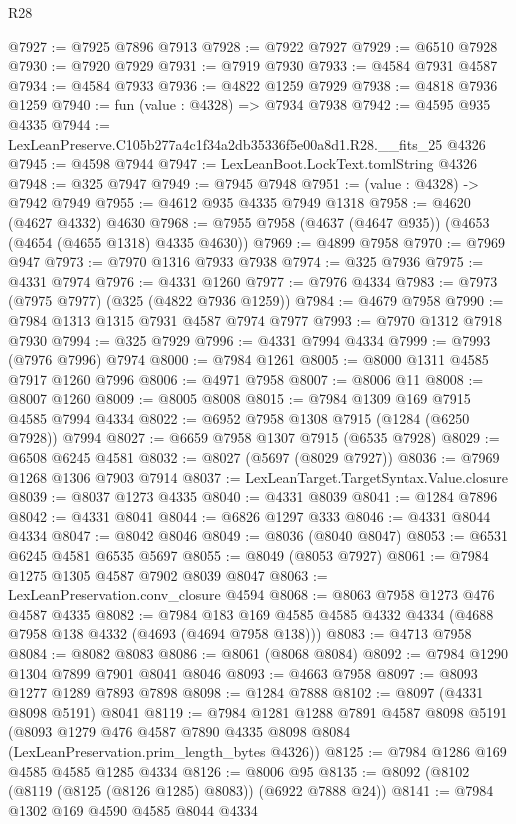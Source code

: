 \begin{lexlean}{R28}
\begin{coremodule}
@7927 := @7925 @7896 @7913
@7928 := @7922 @7927
@7929 := @6510 @7928
@7930 := @7920 @7929
@7931 := @7919 @7930
@7933 := @4584 @7931 @4587
@7934 := @4584 @7933
@7936 := @4822 @1259 @7929
@7938 := @4818 @7936 @1259
@7940 := fun (value : @4328) => @7934 @7938
@7942 := @4595 @935 @4335
@7944 := LexLeanPreserve.C105b277a4c1f34a2db35336f5e00a8d1.R28.__fits_25 @4326
@7945 := @4598 @7944
@7947 := LexLeanBoot.LockText.tomlString @4326
@7948 := @325 @7947
@7949 := @7945 @7948
@7951 := (value : @4328) -> @7942 @7949
@7955 := @4612 @935 @4335 @7949 @1318
@7958 := @4620 (@4627 @4332) @4630
@7968 := @7955 @7958 (@4637 (@4647 @935)) (@4653 (@4654 (@4655 @1318) @4335 @4630))
@7969 := @4899 @7958
@7970 := @7969 @947
@7973 := @7970 @1316 @7933 @7938
@7974 := @325 @7936
@7975 := @4331 @7974
@7976 := @4331 @1260
@7977 := @7976 @4334
@7983 := @7973 (@7975 @7977) (@325 (@4822 @7936 @1259))
@7984 := @4679 @7958
@7990 := @7984 @1313 @1315 @7931 @4587 @7974 @7977
@7993 := @7970 @1312 @7918 @7930
@7994 := @325 @7929
@7996 := @4331 @7994 @4334
@7999 := @7993 (@7976 @7996) @7974
@8000 := @7984 @1261
@8005 := @8000 @1311 @4585 @7917 @1260 @7996
@8006 := @4971 @7958
@8007 := @8006 @11
@8008 := @8007 @1260
@8009 := @8005 @8008
@8015 := @7984 @1309 @169 @7915 @4585 @7994 @4334
@8022 := @6952 @7958 @1308 @7915 (@1284 (@6250 @7928)) @7994
@8027 := @6659 @7958 @1307 @7915 (@6535 @7928)
@8029 := @6508 @6245 @4581
@8032 := @8027 (@5697 (@8029 @7927))
@8036 := @7969 @1268 @1306 @7903 @7914
@8037 := LexLeanTarget.TargetSyntax.Value.closure
@8039 := @8037 @1273 @4335
@8040 := @4331 @8039
@8041 := @1284 @7896
@8042 := @4331 @8041
@8044 := @6826 @1297 @333
@8046 := @4331 @8044 @4334
@8047 := @8042 @8046
@8049 := @8036 (@8040 @8047)
@8053 := @6531 @6245 @4581 @6535 @5697
@8055 := @8049 (@8053 @7927)
@8061 := @7984 @1275 @1305 @4587 @7902 @8039 @8047
@8063 := LexLeanPreservation.conv_closure @4594
@8068 := @8063 @7958 @1273 @476 @4587 @4335
@8082 := @7984 @183 @169 @4585 @4585 @4332 @4334 (@4688 @7958 @138 @4332 (@4693 (@4694 @7958 @138)))
@8083 := @4713 @7958
@8084 := @8082 @8083
@8086 := @8061 (@8068 @8084)
@8092 := @7984 @1290 @1304 @7899 @7901 @8041 @8046
@8093 := @4663 @7958
@8097 := @8093 @1277 @1289 @7893 @7898
@8098 := @1284 @7888
@8102 := @8097 (@4331 @8098 @5191) @8041
@8119 := @7984
    @1281
    @1288
    @7891
    @4587
    @8098
    @5191
    (@8093 @1279 @476 @4587 @7890 @4335 @8098 @8084 (LexLeanPreservation.prim_length_bytes @4326))
@8125 := @7984 @1286 @169 @4585 @4585 @1285 @4334
@8126 := @8006 @95
@8135 := @8092 (@8102 (@8119 (@8125 (@8126 @1285) @8083)) (@6922 @7888 @24))
@8141 := @7984 @1302 @169 @4590 @4585 @8044 @4334

\end{coremodule}
\end{lexlean}
